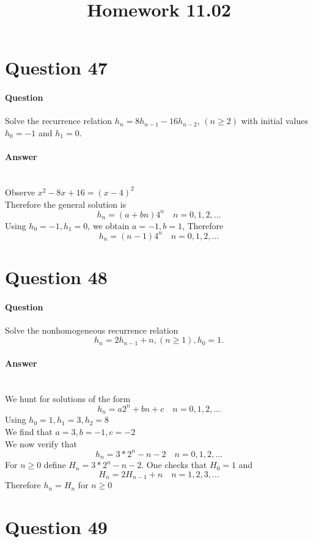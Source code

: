 \documentclass[UTF8]{article}
\title{Homework 11.02}
\date{}
\begin{document}
\maketitle
\section{Question 47}
\paragraph{Question}
Solve the recurrence relation $ h_{n} = 8h_{n - 1} - 16h_{n - 2} $, $ (n \geq 2) $ with initial values $ h_{0} = -1 $ and $ h_{1} = 0 $.
\paragraph{Answer}
    ~\\
    Observe $ x^{2} - 8x + 16 = (x - 4)^{2} $ \\
    Therefore the general solution is
    $$ h_{n} = (a + bn)4^{n} \quad n = 0,1,2,\dots $$
    Using $ h_{0} = -1,h_{1} = 0 $, we obtain $ a = -1 , b = 1 $, Therefore
    $$ h_{n} = (n - 1)4^{n} \quad n = 0,1,2,\dots $$



\section{Question 48}
\paragraph{Question}
Solve the nonhomogeneous recurrence relation
$$ h_{n} = 2h_{n-1} + n , (n \geq 1) , h_{0} = 1.$$
\paragraph{Answer}
~\\
We hunt for solutions of the form
$$ h_{n} = a2^{n} + bn +c \quad n = 0,1,2,\dots $$
Using $ h_{0} = 1, h_{1} = 3, h_{2} = 8 $ \\
We find that $ a = 3, b = -1, c = -2 $ \\
We now verify that
$$ h_{n} = 3 * 2^{n} -n - 2 \quad n = 0,1,2, \dots $$
For $ n \geq 0 $ define $ H_{n} = 3 * 2^{n} - n - 2 $. One checks that $ H_{0} = 1 $ and
$$ H_{n} = 2H_{n - 1} + n \quad n = 1,2,3, \dots $$
Therefore $ h_{n} = H_{n} $ for $ n \geq 0 $
\section{Question 49}
\end{document}
